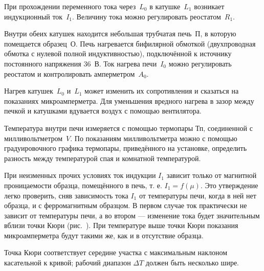 При прохождении переменного тока через~$L_0$ в катушке~$L_1$ возникает
индукционный ток~$I_1$. Величину тока можно регулировать реостатом~$R_1$.

Внутри обеих катушек находится небольшая трубчатая печь~$\text{П}$, в которую
помещается образец~О. Печь нагревается бифилярной обмоткой
(двухпроводная обмотка с нулевой полной индуктивностью),
подключённой к источнику постоянного напряжения 36~В. Ток нагрева печи~$I_0$
можно регулировать реостатом и контролировать амперметром~$A_0$.

Нагрев катушек~$L_0$ и~$L_1$ может изменить их сопротивления и сказаться на
показаниях микроамперметра. Для уменьшения вредного нагрева в зазор между 
печкой и катушками вдувается воздух с помощью вентилятора.

Температура внутри печи измеряется с помощью термопары $\text{Тп}$, соединенной
с милливольтметром~$V$. По показаниям милливольтметра можно с помощью 
градуировочного графика термопары, приведённого на установке, 
определить разность между температурой спая и комнатной
температурой.

При неизменных прочих условиях ток индукции $I_1$ зависит только от магнитной
проницаемости образца, помещённого в печь, т. е. $I_1 = f(\mu)$. Это
утверждение легко проверить, сняв зависимость тока $I_1$ от температуры печи,
когда в ней нет образца, и с ферромагнитным образцом. В первом случае ток
практически не зависит от температуры печи, а во втором --- изменение тока будет
значительным вблизи точки Кюри (рис.~). При температуре выше точки Кюри показания микроамперметра будут
такими же, как и в отсутствие образца.

Точка Кюри соответствует середине участка с максимальным наклоном касательной к
кривой; рабочий диапазон $\Delta T$ должен быть несколько шире.

